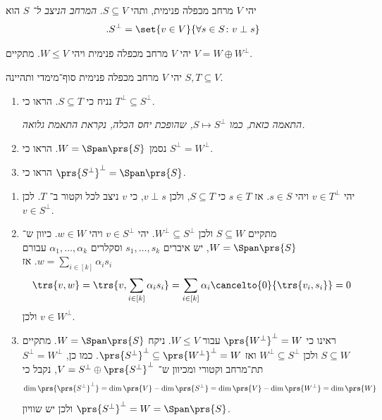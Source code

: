 \documentclass[a4paper,10pt,twoside,openany]{book}
\begin{document}
\begin{definition}
יהי
$V$
מרחב מכפלה פנימית, ותהי
$S \subseteq V$.
\emph{המרחב הניצב ל־%
$S$}
הוא
\[\text{.} S^\perp = \set{v \in V}{\forall s \in S \colon v \perp s}\]
\end{definition}

\begin{proposition}
יהי
$V$
מרחב מכפלה פנימית ויהי
$W \leq V$.
מתקיים
$V = W \oplus W^\perp$.
\end{proposition}

\begin{exercisechap}
יהי
$V$
מרחב מכפלה פנימית סוף־מימדי ותהיינה
$S,T \subseteq V$.

\begin{enumerate}
\item 
נניח כי
$S \subseteq T$.
הראו כי
$T^\perp \subseteq S^\perp$.

\emph{התאמה כזאת, כמו $S \mapsto S^\perp$, שהופכת יחס הכלה, נקראת
\emph{התאמת גלואה}.}

\item
נסמן
$W = \Span\prs{S}$.
הראו כי
$S^\perp = W^\perp$.

\item
הראו כי
$\prs{S^{\perp}}^\perp = \Span\prs{S}$.
\end{enumerate}
\end{exercisechap}

\begin{solution}
\begin{enumerate}
\item
יהי
$v \in T^\perp$
ויהי
$s \in S$.
אז
$s \in T$
כי
$S \subseteq T$,
ולכן
$v \perp s$,
כי
$v$
ניצב לכל וקטור ב־%
$T$.
לכן
$v \in S^\perp$.

\item
מתקיים
$S \subseteq W$
ולכן
$W^\perp \subseteq S^\perp$.
יהי
$v \in S^\perp$
ויהי
$w \in W$.
כיוון ש־%
$W = \Span\prs{S}$,
יש איברים
$s_1, \ldots, s_k$
וסקלרים
$\alpha_1, \ldots, \alpha_k$
עבורם
$w = \sum_{i \in [k]} \alpha_i s_i$.
אז
\[\trs{v,w} = \trs{v, \sum_{i \in [k]} \alpha_i s_i} = \sum_{i \in [k]} \alpha_i \cancelto{0}{\trs{v_i, s_i}} = 0\]
ולכן
$v \in W^\perp$.

\item
ראינו כי
$\prs{W^\perp}^\perp = W$
עבור
$W \leq V$.
ניקח
$W = \Span\prs{S}$.
מתקיים
$S \subseteq W$
ולכן
$W^\perp \subseteq S^\perp$
ואז
$\prs{S^\perp}^\perp \subseteq \prs{W^\perp}^\perp = W$.
כמו כן,
$S^\perp = W^\perp$
תת־מרחב וקטורי ומכיוון ש־%
$V = S^\perp \oplus \prs{S^\perp}^\perp$,
נקבל כי
\[\dim\prs{\prs{S^\perp}^\perp} = \dim\prs{V} - \dim\prs{S^\perp} = \dim\prs{V} - \dim\prs{W^\perp} = \dim\prs{W}\]
ולכן יש שוויון
$\prs{S^\perp}^\perp = W = \Span\prs{S}$.
\end{enumerate}
\end{solution}
\end{document}
